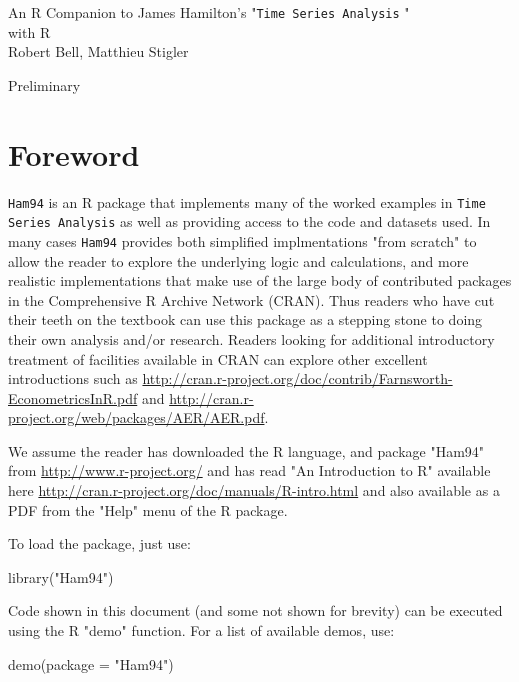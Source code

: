 \documentclass[a4paper]{article}
\renewcommand{\~}{\perispomeni}%
\newcommand{\RcH}{\texttt{Ham94} }
\newcommand{\TSA}{\texttt{Time Series Analysis} }
\begin{document}
\begin{titlepage}
{\centering \huge An R Companion to James Hamilton's "\TSA" \\[0.5cm]
with R\\[0.5cm]
\small Robert Bell, Matthieu Stigler\\}
\vfill\par
{\centering Preliminary\\}
\end{titlepage}

\section*{Foreword} \RcH is an R package that implements many of the worked examples in \TSA
as well as providing access to the code and datasets used.  In many cases \RcH provides both
simplified implmentations "from scratch" to allow the reader to explore the underlying logic and
calculations, and more realistic implementations that make use of the large body
of contributed packages in the Comprehensive R Archive Network (CRAN).  Thus readers who have
cut their teeth on the textbook can use this package as a stepping stone to doing their own
analysis and/or research.  Readers looking for additional introductory treatment of facilities 
available in CRAN can explore other excellent introductions such as \url{http://cran.r-project.org/doc/contrib/Farnsworth-EconometricsInR.pdf}
and \url{http://cran.r-project.org/web/packages/AER/AER.pdf}.

We assume the reader has downloaded the R language, and package "Ham94" from \url{http://www.r-project.org/}
and has read "An Introduction to R" available here \url{http://cran.r-project.org/doc/manuals/R-intro.html}
and also available as a PDF from the "Help" menu of the R package.

To load the package, just use:

\begin{Schunk}
\begin{Sinput}
 library("Ham94")
\end{Sinput}
\end{Schunk}

Code shown in this document (and some not shown for brevity) can be executed using the R "demo" function.  For a list of
available demos, use:

\begin{Schunk}
\begin{Sinput}
 demo(package = "Ham94")
\end{Sinput}
\end{Schunk}
\end{document}

